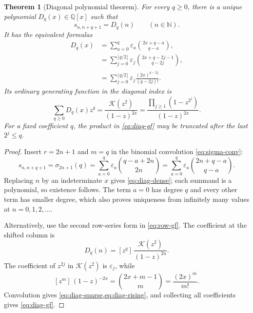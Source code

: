 \documentclass[11pt]{article}
\newtheorem{theorem}{Theorem}[section]
\theoremstyle{definition}
\theoremstyle{remark}
\newcommand{\N}{\mathbb N}
\newcommand{\Q}{\mathbb Q}
\newcommand{\eps}{\varepsilon}
\newcommand{\K}{\mathcal K}
\newcommand{\Diag}{D}
\newcommand{\coeff}[2]{[z^{#1}]\,#2}
\newcommand{\rising}[2]{#1^{\overline{#2}}}
\begin{document}
\begin{theorem}[Diagonal polynomial theorem]\label{thm:diag-main}
For every \(q\geq0\), there is a unique polynomial
\(\Diag_q(x)\in\Q[x]\) such that
\begin{equation}
 s_{n,n+q+1}=\Diag_q(n)\qquad(n\in\N).                     \label{eq:diag-interp}
\end{equation}
It has the equivalent formulas
\begin{align}
 \Diag_q(x)
 &=\sum_{a=0}^{q}\eps_a
   \binom{2x+q-a}{q-a},                                    \label{eq:diag-dense}\\
 &=\sum_{j=0}^{\lfloor q/2\rfloor}\eps_j
   \binom{2x+q-2j-1}{q-2j},                               \label{eq:diag-sparse}\\
 &=\sum_{j=0}^{\lfloor q/2\rfloor}\eps_j
   \frac{\rising{(2x)}{q-2j}}{(q-2j)!}.                   \label{eq:diag-rising}
\end{align}
Its ordinary generating function in the diagonal index is
\begin{equation}
 \boxed{
 \sum_{q\geq0}\Diag_q(x)z^q
  =\frac{\K(z^2)}{(1-z)^{2x}}
  =\frac{\displaystyle\prod_{j\geq1}(1-z^{2^j})}
         {(1-z)^{2x}}.}                                    \label{eq:diag-gf}
\end{equation}
For a fixed coefficient \(q\), the product in \cref{eq:diag-gf} may be
truncated after the last \(2^j\leq q\).
\end{theorem}

\begin{proof}
Insert \(r=2n+1\) and \(m=q\) in the binomial convolution
\cref{eq:sigma-conv}:
\[
 s_{n,n+q+1}=\sigma_{2n+1}(q)
 =\sum_{a=0}^{q}\eps_a\binom{q-a+2n}{2n}
 =\sum_{a=0}^{q}\eps_a\binom{2n+q-a}{q-a}.
\]
Replacing \(n\) by an indeterminate \(x\) gives
\cref{eq:diag-dense}; each summand is a polynomial, so existence follows.
The term \(a=0\) has degree \(q\) and every other term has smaller degree,
which also proves uniqueness from infinitely many values at
\(n=0,1,2,\ldots\).

Alternatively, use the second row-series form in \cref{eq:row-gf}.  The
coefficient at the shifted column is
\[
 \Diag_q(n)=\coeff{q}{\frac{\K(z^2)}{(1-z)^{2n}}}.
\]
The coefficient of \(z^{2j}\) in \(\K(z^2)\) is \(\eps_j\), while
\[
 \coeff{m}{(1-z)^{-2x}}
 =\binom{2x+m-1}{m}
 =\frac{\rising{(2x)}m}{m!}.
\]
Convolution gives \cref{eq:diag-sparse,eq:diag-rising}, and collecting all
coefficients gives \cref{eq:diag-gf}.
\end{proof}
\end{document}
